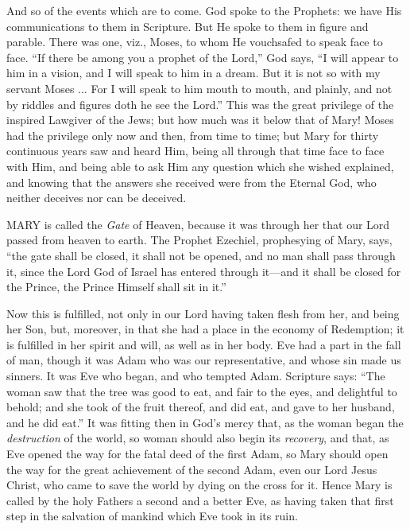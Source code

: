 And so of the events which are
to come. God spoke to the Prophets: we have His communications to them
in Scripture. But He spoke to them in figure and parable. There was one,
viz., Moses, to whom He vouchsafed to speak face to face. ``If there be
among you a prophet of the Lord,'' God says, ``I will appear to him
in a vision, and I will speak to him in a dream. But it is not so with
my servant Moses ... For I will speak to him mouth to mouth, and
plainly, and not by riddles and figures doth he see the Lord.'' This was
the great privilege of the inspired Lawgiver of the Jews; but how much
was it below that of Mary! Moses had the privilege only now and then,
from time to time; but Mary for thirty continuous years saw and heard
Him, being all through that time face to face with Him, and being able
to ask Him any question which she wished explained, and knowing that the
answers she received were from the Eternal God, who neither deceives nor
can be deceived.



MARY
is called the \emph{Gate} of Heaven, because it was through her that our
Lord passed from heaven to earth. The Prophet Ezechiel, prophesying of
Mary, says, ``the gate shall be closed, it shall not be opened, and no
man shall pass through it, since the Lord God of Israel has entered
through it—and it shall be closed for the Prince, the Prince Himself
shall sit in it.''

Now this is fulfilled, not only
in our Lord having taken flesh from her, and being her Son, but,
moreover, in that she had a place in the economy of Redemption; it is
fulfilled in her spirit and will, as well as in her body. Eve had a part
in the fall of man, though it was Adam who was our representative, and
whose sin made us sinners. It was Eve who began, and who tempted Adam.
Scripture says: ``The woman saw that the tree was good to eat, and fair
to the eyes, and delightful to behold; and she took of the fruit
thereof, and did eat, and gave to her husband, and he did eat.'' It was
fitting then in God's mercy that, as the woman began the \emph{destruction}
of the world, so woman should also begin its \emph{recovery}, and that,
as Eve opened the way for the fatal deed of the first Adam, so Mary
should open the way for the great achievement of the second Adam, even
our Lord Jesus Christ, who came to save the world by dying on the cross
for it. Hence Mary is called by the holy Fathers a second and a better
Eve, as having taken that first step in the salvation of mankind which
Eve took in its ruin.

